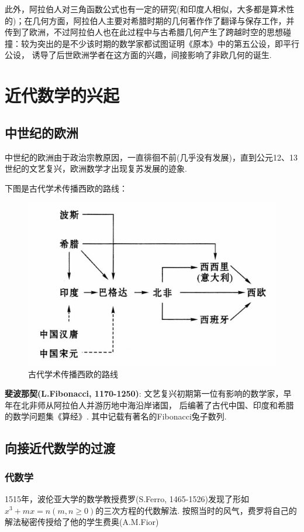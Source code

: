 \documentclass{Math_Note}
\begin{document}
此外，阿拉伯人对三角函数公式也有一定的研究(和印度人相似，大多都是算术性的)；在几何方面，阿拉伯人主要对希腊时期的几何著作作了翻译与保存工作，并
传到了欧洲，不过阿拉伯人也在此过程中与古希腊几何产生了跨越时空的思想碰撞：较为突出的是不少该时期的数学家都试图证明《原本》中的第五公设，即平行公设，
诱导了后世欧洲学者在这方面的兴趣，间接影响了非欧几何的诞生. 

\section{近代数学的兴起}
\subsection{中世纪的欧洲}
中世纪的欧洲由于政治宗教原因，一直徘徊不前(几乎没有发展)，直到公元12、13世纪的文艺复兴，欧洲数学才出现复苏发展的迹象. 

下图是古代学术传播西欧的路线：

\begin{figure}[H]
    \centering
    \includegraphics[scale=0.8]{"./Figures/Academia_spread_to_Euro.png"}
    \caption{古代学术传播西欧的路线}
\end{figure}

\textbf{斐波那契(L.Fibonacci, 1170-1250)}: 文艺复兴初期第一位有影响的数学家，早年在北非师从阿拉伯人并游历地中海沿岸诸国，
后编著了古代中国、印度和希腊的数学问题集《算经》. 其中记载有著名的Fibonacci兔子数列.

\subsection{向接近代数学的过渡}
\subsubsection{代数学}
1515年，波伦亚大学的数学教授费罗(S.Ferro, 1465-1526)发现了形如$x^{3}+mx=n (m,n \geq 0)$的三次方程的代数解法.
按照当时的风气，费罗将自己的解法秘密传授给了他的学生费奥(A.M.Fior)
\end{document}
